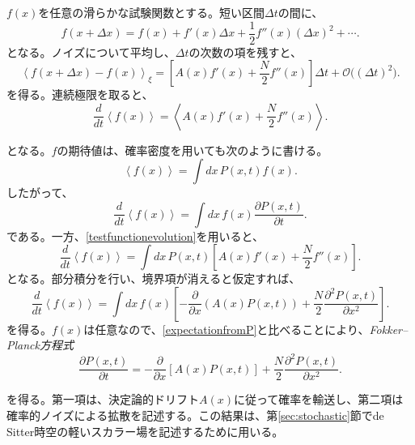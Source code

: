 \documentclass[a4paper,11pt,oneside]{article}
\theoremstyle{definition}
\numberwithin{equation}{section}
\begin{document}
\(f(x)\)を任意の滑らかな試験関数とする。短い区間\(\Delta t\)の間に、
\begin{equation}
f(x+\Delta x)
=
f(x)
+
f'(x)\Delta x
+
\frac{1}{2}f''(x)(\Delta x)^{2}
+
\cdots .
\end{equation}
となる。ノイズについて平均し、\(\Delta t\)の次数の項を残すと、
\begin{equation}
\left\langle
f(x+\Delta x)-f(x)
\right\rangle_{\xi}
=
\left[
A(x)f'(x)
+
\frac{N}{2}f''(x)
\right]
\Delta t
+
\mathcal O\bigl((\Delta t)^{2}\bigr).
\end{equation}
を得る。連続極限を取ると、
\begin{equation}
\frac{d}{dt}
\left\langle
f(x)
\right\rangle
=
\left\langle
A(x)f'(x)
+
\frac{N}{2}f''(x)
\right\rangle.
\label{testfunctionevolution}
\end{equation}


となる。\(f\)の期待値は、確率密度を用いても次のように書ける。
\begin{equation}
\left\langle
f(x)
\right\rangle
=
\int dx\,P(x,t)f(x).
\end{equation}
したがって、
\begin{equation}
\frac{d}{dt}
\left\langle
f(x)
\right\rangle
=
\int dx\,
f(x)
\frac{\partial P(x,t)}{\partial t}.
\label{expectationfromP}
\end{equation}
である。一方、\eqref{testfunctionevolution}を用いると、
\begin{equation}
\frac{d}{dt}
\left\langle
f(x)
\right\rangle
=
\int dx\,P(x,t)
\left[
A(x)f'(x)
+
\frac{N}{2}f''(x)
\right].
\end{equation}
となる。部分積分を行い、境界項が消えると仮定すれば、
\begin{equation}
\frac{d}{dt}
\left\langle
f(x)
\right\rangle
=
\int dx\,f(x)
\left[
-
\frac{\partial}{\partial x}
\left(
A(x)P(x,t)
\right)
+
\frac{N}{2}
\frac{\partial^{2}P(x,t)}{\partial x^{2}}
\right].
\end{equation}
を得る。\(f(x)\)は任意なので、\eqref{expectationfromP}と比べることにより、\textit{Fokker--Planck方程式}
\begin{equation}
\frac{\partial P(x,t)}{\partial t}
=
-
\frac{\partial}{\partial x}
\left[
A(x)P(x,t)
\right]
+
\frac{N}{2}
\frac{\partial^{2}P(x,t)}{\partial x^{2}}.
\label{fokkerplanckgeneral}
\end{equation}


を得る。第一項は、決定論的ドリフト\(A(x)\)に従って確率を輸送し、第二項は確率的ノイズによる拡散を記述する。この結果は、第\ref{sec:stochastic}節でde Sitter時空の軽いスカラー場を記述するために用いる。
\end{document}
